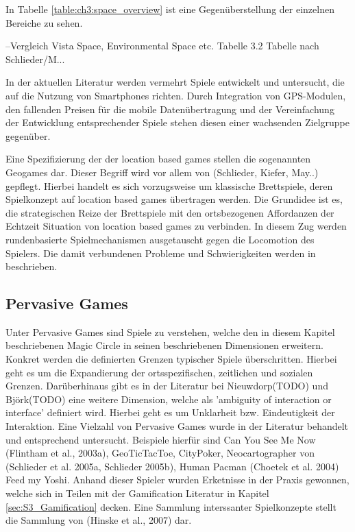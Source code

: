 In Tabelle \ref{table:ch3:space_overview} ist eine Gegenüberstellung der einzelnen Bereiche zu sehen.

--Vergleich Vista Space, Environmental Space etc. Tabelle 3.2
Tabelle nach Schlieder/M...
\label{table:ch3:space_overview}

In der aktuellen Literatur werden vermehrt Spiele entwickelt und untersucht, die auf die Nutzung von Smartphones richten. \cite{Rashid.2006a}
Durch Integration von GPS-Modulen, den fallenden Preisen für die mobile Datenübertragung und der Vereinfachung der Entwicklung entsprechender Spiele stehen diesen einer wachsenden Zielgruppe gegenüber.

Eine Spezifizierung der der location based games stellen die sogenannten Geogames dar. Dieser Begriff wird vor allem von (Schlieder, Kiefer, May..) gepflegt. Hierbei handelt es sich vorzugsweise um klassische Brettspiele, deren Spielkonzept auf location based games übertragen werden. Die Grundidee ist es, die strategischen Reize der Brettspiele mit den ortsbezogenen Affordanzen der Echtzeit Situation von location based games zu verbinden. In diesem Zug werden rundenbasierte Spielmechanismen ausgetauscht gegen die Locomotion des Spielers. Die damit verbundenen Probleme und Schwierigkeiten werden in \cite{Schlieder.2006} beschrieben.

\subsection*{Pervasive Games}

Unter Pervasive Games sind Spiele zu verstehen, welche den in diesem Kapitel beschriebenen Magic Circle in seinen beschriebenen Dimensionen erweitern.
Konkret werden die definierten Grenzen typischer Spiele überschritten. \cite{Montola.2005}
Hierbei geht es um die Expandierung der ortsspezifischen, zeitlichen und sozialen Grenzen. \cite{Montola.2009}
Darüberhinaus gibt es in der Literatur bei Nieuwdorp(TODO) und Björk(TODO) eine weitere Dimension, welche als 'ambiguity 
of interaction or interface' definiert wird. Hierbei geht es um Unklarheit bzw. Eindeutigkeit der Interaktion.
Eine Vielzahl von Pervasive Games wurde in der Literatur behandelt und entsprechend untersucht.
Beispiele hierfür sind Can You See Me Now (Flintham et al., 2003a), GeoTicTacToe, CityPoker, Neocartographer von (Schlieder et al. 2005a, Schlieder 2005b), Human Pacman (Choetek et al. 2004) Feed my Yoshi.
Anhand dieser Spieler wurden Erketnisse in der Praxis gewonnen, welche sich in Teilen mit der Gamification Literatur in Kapitel \ref{sec:S3_Gamification} decken.
Eine Sammlung interssanter Spielkonzepte stellt die Sammlung von (Hinske et al., 2007) dar.


